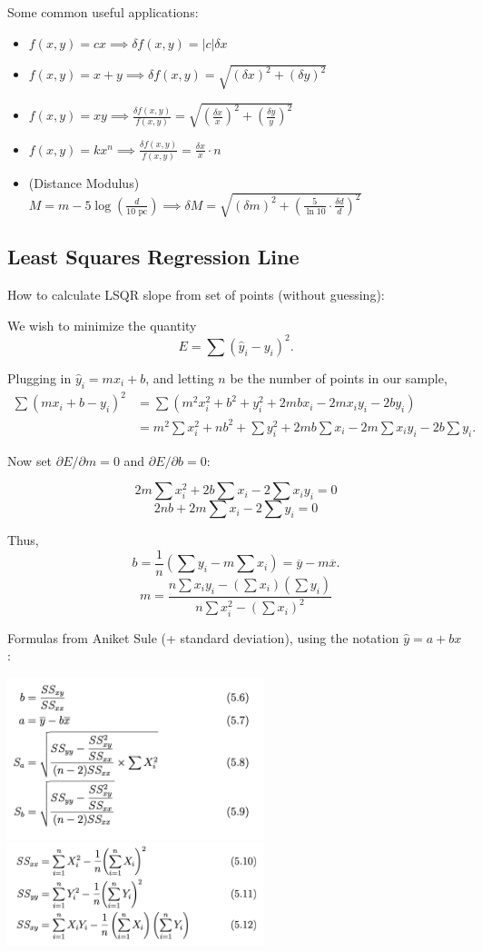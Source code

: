 \documentclass[12pt]{article}
\begin{document}
Some common useful applications: 
\begin{itemize}
\item $f(x,y) = cx \implies \delta f(x,y) = \vert c\vert \delta x$
\item $f(x,y) = x+y \implies \delta f(x,y) = \sqrt{(\delta x)^2+(\delta y)^2}$
\item $f(x,y) = xy \implies \displaystyle \frac{\delta f(x,y)}{f(x,y)} = \sqrt{\left(\frac{\delta x}{x}\right)^2 + \left(\frac{\delta y}{y}\right)^2}$
\item $f(x,y) = kx^n \implies \displaystyle \frac{\delta f(x,y)}{f(x,y)} = \frac{\delta x}{x}\cdot n$
\item (Distance Modulus) \newline 
$\displaystyle M = m - 5\log{\left(\frac{d}{10\text{ pc}}\right)} \implies \delta M = \sqrt{(\delta m)^2 + \left(\frac{5}{\ln{10}}\cdot \frac{\delta d}{d}\right)^2}$
\end{itemize}

\subsection{Least Squares Regression Line}

How to calculate LSQR slope from set of points (without guessing):

We wish to minimize the quantity 
\[E = \sum (\hat{y}_i- y_i)^2.\]

Plugging in $\hat{y}_i = mx_i+b$, and letting $n$ be the number of points in our sample,
\begin{align*}
\sum (mx_i+b-y_i)^2 &= \sum (m^2x_i^2 + b^2 + y_i^2 + 2mbx_i - 2mx_iy_i - 2by_i) \\
&= m^2 \sum x_i^2 + nb^2 + \sum y_i^2 + 2mb\sum x_i - 2m\sum x_iy_i - 2b\sum y_i.
\end{align*}

Now set $\partial E/\partial m = 0$ and $\partial E/\partial b = 0$:

\[2m\sum x_i^2 + 2b\sum x_i - 2\sum x_iy_i = 0\]
\[2nb + 2m\sum x_i - 2\sum y_i = 0\]

Thus, 
\[b = \frac{1}{n}\left(\sum y_i - m\sum x_i\right) = \overline{y} - m\overline{x}.\]
\[m = \frac{n\sum x_i y_i - (\sum x_i)(\sum y_i)}{n\sum x_i^2 - (\sum x_i)^2}\]

Formulas from Aniket Sule (+ standard deviation), using the notation $\hat{y} = a+bx$:

\includegraphics[width=7.5cm]{images/lsqr1.png}
\includegraphics[width=7.5cm]{images/lsqr2.png}
\end{document}
